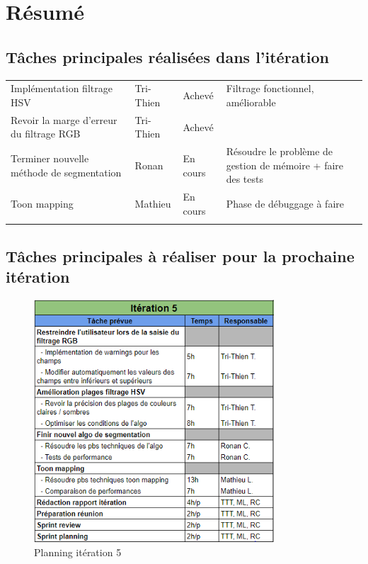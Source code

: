 \documentclass[12pt,titlepage,french]{article}
\begin{document}
\section{Résumé}
\subsection{Tâches principales réalisées dans l'itération}

\noindent\begin{tabu} to \toprule
  &&&\\\toprule
Implémentation filtrage HSV
& Tri-Thien
& Achevé
& Filtrage fonctionnel, améliorable\\\midrule
Revoir la marge d'erreur du filtrage RGB
& Tri-Thien
& Achevé
& \\\midrule
Terminer nouvelle méthode de segmentation
& Ronan
& En cours
& Résoudre le problème de gestion de mémoire + faire des tests \\\midrule
Toon mapping
& Mathieu
& En cours
& Phase de débuggage à faire\\\bottomrule  \\
\end{tabu}

\subsection{Tâches principales à réaliser pour la prochaine itération}

\begin{figure}[H]
 \caption{\label{} Planning itération 5}
 \begin{center}
 \includegraphics[width=0.8\textwidth]{./img/planning.PNG}
  \end{center}
\end{figure}
\end{document}

